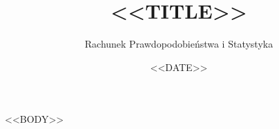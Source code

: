 \documentclass[polish,10pt]{extarticle}
\title{<<TITLE>>}
\author{Rachunek Prawdopodobieństwa i Statystyka}
\date{<<DATE>>}
\begin{document}
\maketitle
\vspace{-1.2cm}

<<BODY>>
\end{document}
